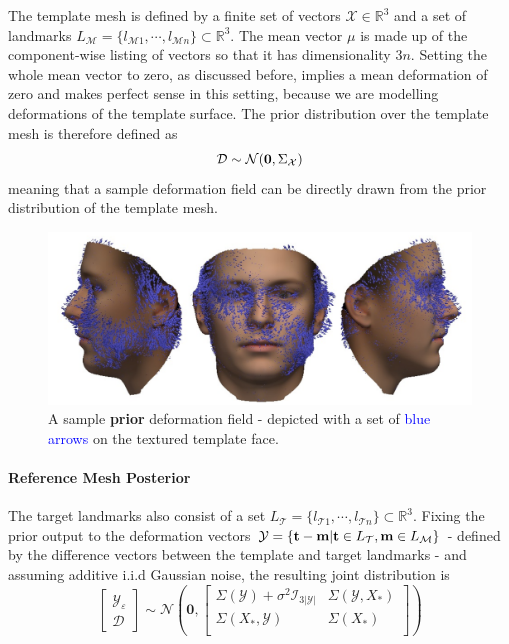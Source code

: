 The template mesh is defined by a finite set of vectors $\mathcal{X} \in \mathbb{R}^3$ and a set of landmarks $L_\mathcal{M}=\{l_{\mathcal{M}1}, \cdots, l_{\mathcal{M}n}\} \subset \mathbb{R}^3$.
The mean vector $\mu$ is made up of the component-wise listing of vectors so that it has dimensionality $3n$. Setting the whole mean vector to zero, as discussed before, implies a mean deformation of zero and makes perfect sense in this setting, because we are modelling deformations of the template surface. 
The prior distribution over the template mesh is therefore defined as 
\begin{equation}
    \mathcal{D} \sim \mathcal{N}(\textbf{0}, \Sigma_{\mathcal{X}})
\end{equation}
meaning that a sample deformation field can be directly drawn from the prior distribution of the template mesh.
\begin{figure}[h!]
    \includegraphics[width=\textwidth]{./resources/img/prior_deformations.pdf}
    \caption{A sample \textbf{prior} deformation field - depicted with a set of \textcolor{blue}{blue arrows} on the textured template face.}
\label{fig:priordeformations}
\end{figure}
\paragraph{Reference Mesh Posterior}
The target landmarks also consist of a set $L_{\mathcal{T}} = \{l_{\mathcal{T}1},\cdots, l_{\mathcal{T}n}\} \subset \mathbb{R}^3$. 
Fixing the prior output to the deformation vectors $\mathcal{Y}=\{\textbf{t}-\textbf{m}\vert \textbf{t} \in L_{\mathcal{T}}, \textbf{m} \in L_{\mathcal{M}}\}$ - defined by the difference vectors between the template and target landmarks - and assuming additive i.i.d Gaussian noise, the resulting joint distribution is
\begin{equation}
    \begin{bmatrix}\mathcal{Y_{\varepsilon}}\\\mathcal{D}\end{bmatrix}
\sim \mathcal{N}\left(\textbf{0},
\begin{bmatrix}
    \Sigma(\mathcal{Y}) + \sigma^2\mathcal{I}_{3\left|\mathcal{Y} \right|} & \Sigma(\mathcal{Y},X_{*})\\
    \Sigma(X_{*},\mathcal{Y}) & \Sigma(X_{*})\\
\end{bmatrix}
\right)
\end{equation}

